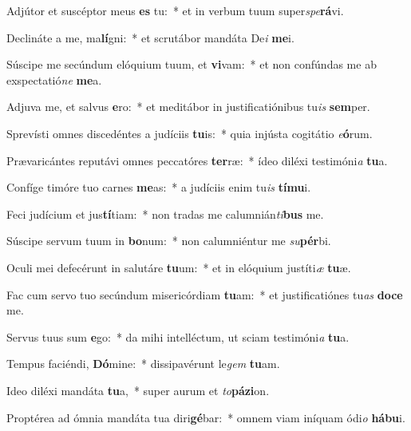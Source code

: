 \item Adjútor et suscéptor meus \textbf{es} tu:~* et in verbum tuum super\textit{spe}\textbf{rá}vi.
\item Declináte a me, ma\textbf{lí}gni:~* et scrutábor mandáta De\textit{i} \textbf{me}i.
\item Súscipe me secúndum elóquium tuum, et \textbf{vi}vam:~* et non confúndas me ab exspectatió\textit{ne} \textbf{me}a.
\item Adjuva me, et salvus \textbf{e}ro:~* et meditábor in justificatiónibus tu\textit{is} \textbf{sem}per.
\item Sprevísti omnes discedéntes a judíciis \textbf{tu}is:~* quia injústa cogitátio \textit{e}\textbf{ó}rum.
\item Prævaricántes reputávi omnes peccatóres \textbf{ter}ræ:~* ídeo diléxi testimóni\textit{a} \textbf{tu}a.
\item Confíge timóre tuo carnes \textbf{me}as:~* a judíciis enim tu\textit{is} \textbf{tí}\textbf{mu}i.
\item Feci judícium et jus\textbf{tí}tiam:~* non tradas me calumnián\textit{ti}\textbf{bus} me.
\item Súscipe servum tuum in \textbf{bo}num:~* non calumniéntur me \textit{su}\textbf{pér}bi.
\item Oculi mei defecérunt in salutáre \textbf{tu}um:~* et in elóquium justíti\textit{æ} \textbf{tu}æ.
\item Fac cum servo tuo secúndum misericórdiam \textbf{tu}am:~* et justificatiónes tu\textit{as} \textbf{do}\textbf{ce} me.
\item Servus tuus sum \textbf{e}go:~* da mihi intelléctum, ut sciam testimóni\textit{a} \textbf{tu}a.
\item Tempus faciéndi, \textbf{Dó}mine:~* dissipavérunt le\textit{gem} \textbf{tu}am.
\item Ideo diléxi mandáta \textbf{tu}a,~* super aurum et \textit{to}\textbf{pá}\textbf{zi}on.
\item Proptérea ad ómnia mandáta tua diri\textbf{gé}bar:~* omnem viam iníquam ódi\textit{o} \textbf{há}\textbf{bu}i.
